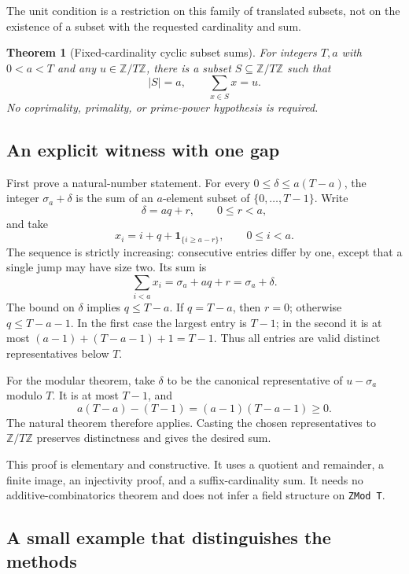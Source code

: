 \documentclass[11pt,letterpaper]{article}
\newtheorem{theorem}{Theorem}[section]
\newcommand{\Z}{\mathbb Z}
\newcommand{\Zm}[1]{\Z/#1\Z}
\newcommand{\card}[1]{\lvert #1\rvert}
\begin{document}
The unit condition is a restriction on this family of translated subsets,
not on the existence of a subset with the requested cardinality and sum.

\begin{theorem}[Fixed-cardinality cyclic subset sums]
For integers $T,a$ with $0<a<T$ and any $u\in\Zm T$, there is a subset
$S\subseteq\Zm T$ such that
\[
 \card S=a,\qquad \sum_{x\in S}x=u.
\]
No coprimality, primality, or prime-power hypothesis is required.
\end{theorem}

\subsection{An explicit witness with one gap}

First prove a natural-number statement. For every
$0\le\delta\le a(T-a)$, the integer $\sigma_a+\delta$ is the sum of an
$a$-element subset of $\{0,\ldots,T-1\}$. Write
\[
 \delta=aq+r,\qquad 0\le r<a,
\]
and take
\begin{equation}
 x_i=i+q+\mathbf 1_{\{i\ge a-r\}},\qquad 0\le i<a.
 \label{eq:staircase}
\end{equation}
The sequence is strictly increasing: consecutive entries differ by one,
except that a single jump may have size two. Its sum is
\[
 \sum_{i<a}x_i=\sigma_a+aq+r=\sigma_a+\delta.
\]
The bound on $\delta$ implies $q\le T-a$. If $q=T-a$, then $r=0$;
otherwise $q\le T-a-1$. In the first case the largest entry is $T-1$;
in the second it is at most $(a-1)+(T-a-1)+1=T-1$. Thus all entries are
valid distinct representatives below $T$.

For the modular theorem, take $\delta$ to be the canonical representative of
$u-\sigma_a$ modulo $T$. It is at most $T-1$, and
\begin{equation}
 a(T-a)-(T-1)=(a-1)(T-a-1)\ge0.
 \label{eq:window}
\end{equation}
The natural theorem therefore applies. Casting the chosen representatives
to $\Zm T$ preserves distinctness and gives the desired sum.

This proof is elementary and constructive. It uses a quotient and remainder,
a finite image, an injectivity proof, and a suffix-cardinality sum. It needs
no additive-combinatorics theorem and does not infer a field structure on
\texttt{ZMod T}.

\subsection{A small example that distinguishes the methods}
\end{document}
